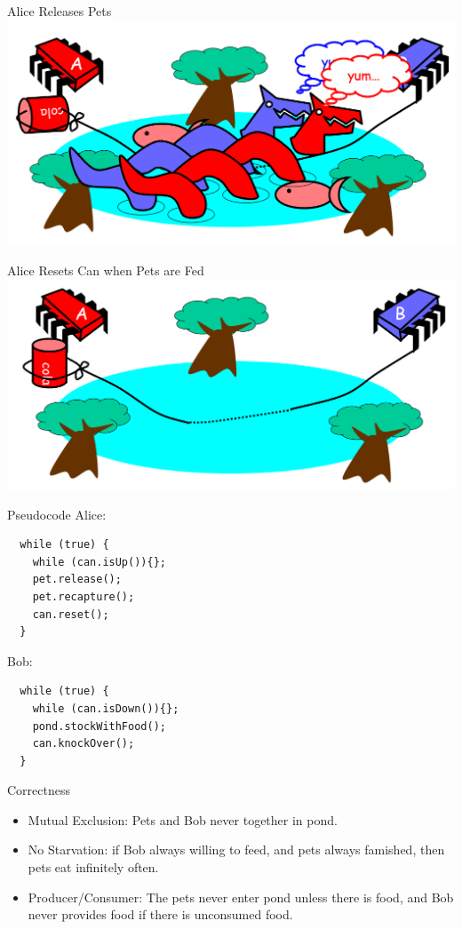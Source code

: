 \begin{frame}{Alice Releases Pets}
  \includegraphics[width=\textwidth]{figures/pets-7}
\end{frame}

\begin{frame}{Alice Resets Can when Pets are Fed}
  \includegraphics[width=\textwidth]{figures/pets-8}
\end{frame}

\begin{frame}[fragile]{Pseudocode}
  Alice:
  \begin{lstlisting}
  while (true) {
    while (can.isUp()){};
    pet.release();
    pet.recapture();
    can.reset();
  }
  \end{lstlisting}

  
  Bob:
  \begin{lstlisting}
  while (true) {
    while (can.isDown()){};
    pond.stockWithFood();
    can.knockOver();
  } 
  \end{lstlisting}
\end{frame}

\begin{frame}{Correctness}
  \begin{itemize}
  \item Mutual Exclusion: Pets and Bob never together in pond.
  \item No Starvation: if Bob always willing to feed, and pets always
    famished, then pets eat infinitely often.
  \item Producer/Consumer: The pets never enter pond unless there is
    food, and Bob never provides food if there is unconsumed food.
  \end{itemize}
\end{frame}


